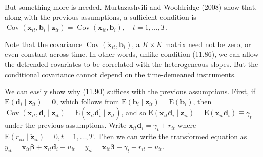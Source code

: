 \documentclass[10pt]{article}
\begin{document}
But something more is needed. Murtazashvili and Wooldridge (2008) show that, along with the previous assumptions, a sufficient condition is\\
$\operatorname{Cov}\left(\ddot{\mathbf{x}}_{i t}, \mathbf{b}_{i} \mid \ddot{\mathbf{z}}_{i t}\right)=\operatorname{Cov}\left(\ddot{\mathbf{x}}_{i t}, \mathbf{b}_{i}\right), \quad t=1, \ldots, T$.

Note that the covariance $\operatorname{Cov}\left(\ddot{\mathbf{x}}_{i t}, \mathbf{b}_{i}\right)$, a $K \times K$ matrix need not be zero, or even constant across time. In other words, unlike condition (11.86), we can allow the detrended covariates to be correlated with the heterogeneous slopes. But the conditional covariance cannot depend on the time-demeaned instruments.

We can easily show why (11.90) suffices with the previous assumptions. First, if $\mathrm{E}\left(\mathbf{d}_{i} \mid \ddot{\mathbf{z}}_{i t}\right)=\mathbf{0}$, which follows from $\mathrm{E}\left(\mathbf{b}_{i} \mid \ddot{\mathbf{z}}_{i t}\right)=\mathrm{E}\left(\mathbf{b}_{i}\right)$, then $\operatorname{Cov}\left(\ddot{\mathbf{x}}_{i t}, \mathbf{d}_{i} \mid \ddot{\mathbf{z}}_{i t}\right)= \mathrm{E}\left(\ddot{\mathbf{x}}_{i t} \mathbf{d}_{i}^{\prime} \mid \ddot{\mathbf{z}}_{i t}\right)$, and so $\mathrm{E}\left(\ddot{\mathbf{x}}_{i t} \mathbf{d}_{i} \mid \ddot{\mathbf{z}}_{i t}\right)=\mathrm{E}\left(\ddot{\mathbf{x}}_{i t} \mathbf{d}_{i}\right) \equiv \gamma_{t}$ under the previous assumptions. Write $\ddot{\mathbf{x}}_{i t} \mathbf{d}_{i}=\gamma_{t}+r_{i t}$ where $\mathrm{E}\left(r_{i t i} \mid \ddot{\mathbf{z}}_{i t}\right)=0, t=1, \ldots, T$. Then we can write the transformed equation as\\
$\ddot{y}_{i t}=\ddot{\mathbf{x}}_{i t} \boldsymbol{\beta}+\ddot{\mathbf{x}}_{i t} \mathbf{d}_{i}+\ddot{u}_{i t}=\ddot{y}_{i t}=\ddot{\mathbf{x}}_{i t} \boldsymbol{\beta}+\gamma_{t}+r_{i t}+\ddot{u}_{i t}$.
\end{document}
